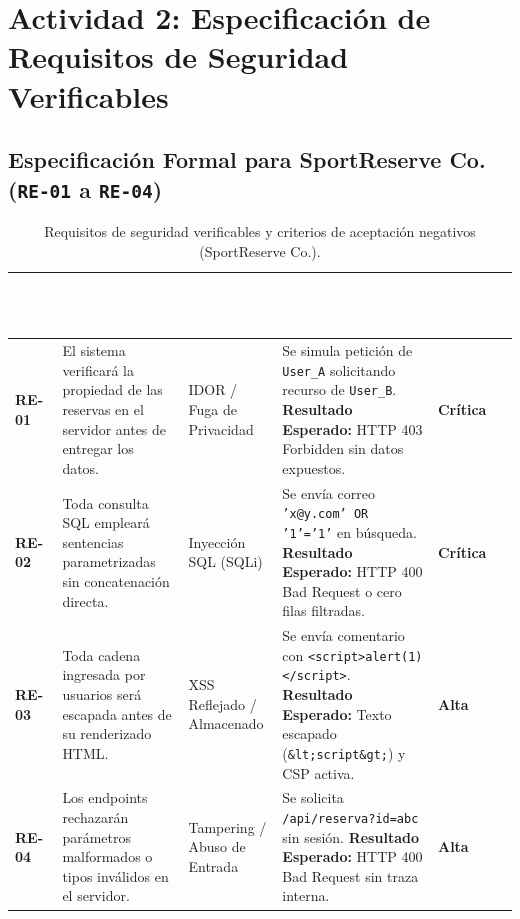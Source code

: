 \documentclass[12pt,a4paper]{article}
\begin{document}
\section{Actividad 2: Especificación de Requisitos de Seguridad Verificables}

\subsection{Especificación Formal para SportReserve Co. (\texttt{RE-01} a \texttt{RE-04})}
\begin{table}[H]
\centering
\caption{Requisitos de seguridad verificables y criterios de aceptación negativos (SportReserve Co.).}
\label{tab:requisitos_re}
\begin{tabularx}{\textwidth}{>{\bfseries\centering\arraybackslash}p{1.2cm} >{\raggedright\arraybackslash}p{3.8cm} >{\raggedright\arraybackslash}p{2.3cm} >{\raggedright\arraybackslash}X >{\centering\arraybackslash}p{1.6cm}}
\hline
\rowcolor{unsaacMaroon} \textcolor{white}{ID Req.} & \textcolor{white}{Requisito de Seguridad Verificada} & \textcolor{white}{Amenaza Asociada} & \textcolor{white}{Criterio de Aceptación / Validación} & \textcolor{white}{Prioridad} \\
\hline
RE-01 & El sistema verificará la propiedad de las reservas en el servidor antes de entregar los datos. & IDOR / Fuga de Privacidad & Se simula petición de \texttt{User\_A} solicitando recurso de \texttt{User\_B}. \textbf{Resultado Esperado:} HTTP 403 Forbidden sin datos expuestos. & \textbf{Crítica} \\
\hline
\rowcolor{rowAlt} RE-02 & Toda consulta SQL empleará sentencias parametrizadas sin concatenación directa. & Inyección SQL (SQLi) & Se envía correo \texttt{'x@y.com' OR '1'='1'} en búsqueda. \textbf{Resultado Esperado:} HTTP 400 Bad Request o cero filas filtradas. & \textbf{Crítica} \\
\hline
RE-03 & Toda cadena ingresada por usuarios será escapada antes de su renderizado HTML. & XSS Reflejado / Almacenado & Se envía comentario con \texttt{<script>alert(1)</script>}. \textbf{Resultado Esperado:} Texto escapado (\texttt{\&lt;script\&gt;}) y CSP activa. & \textbf{Alta} \\
\hline
\rowcolor{rowAlt} RE-04 & Los endpoints rechazarán parámetros malformados o tipos inválidos en el servidor. & Tampering / Abuso de Entrada & Se solicita \texttt{/api/reserva?id=abc} sin sesión. \textbf{Resultado Esperado:} HTTP 400 Bad Request sin traza interna. & \textbf{Alta} \\
\hline
\end{tabularx}
\end{table}
\end{document}
